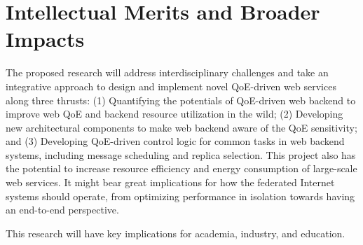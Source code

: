 \section{Intellectual Merits and Broader Impacts}

The proposed research will address interdisciplinary challenges and take an integrative approach to design and implement novel QoE-driven web services along three thrusts: 
(1) Quantifying the potentials of QoE-driven web backend to improve web QoE and backend resource utilization in the wild;
(2) Developing new architectural components to make web backend aware of the QoE sensitivity; and
(3) Developing QoE-driven control logic for common tasks in web backend systems, including message scheduling and replica selection.
This project also has the potential to increase resource efficiency and energy consumption of large-scale web services.
It might bear great implications for how the federated Internet systems should operate, from optimizing performance in isolation towards having an end-to-end perspective.

This research
will have key implications for academia, industry, and education.


